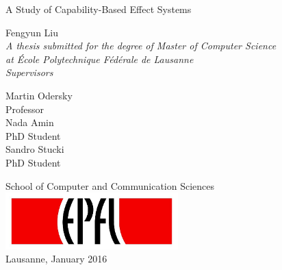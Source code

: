 \begin{titlepage}

  \begin{center}

    \vspace*{2\baselineskip}
    {\LARGE A Study of Capability-Based Effect Systems\\[2cm] }

    \noindent
    {\Large Fengyun Liu} \\[2cm]

    \noindent
    \emph{A thesis submitted for the degree of Master of Computer
      Science \\
    at École Polytechnique Fédérale de Lausanne} \\[1.8cm]

    \textit{Supervisors}

    \noindent
    \begin{multicols}{3}
    {\large Martin Odersky} \\
    Professor \\
    \vfill
    \columnbreak
    {\large Nada Amin} \\
    PhD Student \\
    \vfill
    \columnbreak
    {\large Sandro Stucki}\\
    PhD Student \\
    \end{multicols}

    \vspace*{2\baselineskip}

    \noindent
    {School of Computer and Communication Sciences \\[1cm]}
    \includegraphics[width=0.5\textwidth]{img/epfl}~\\[1cm]
    \noindent
    Lausanne, January 2016 \\[1cm]



  \end{center}

\end{titlepage}
